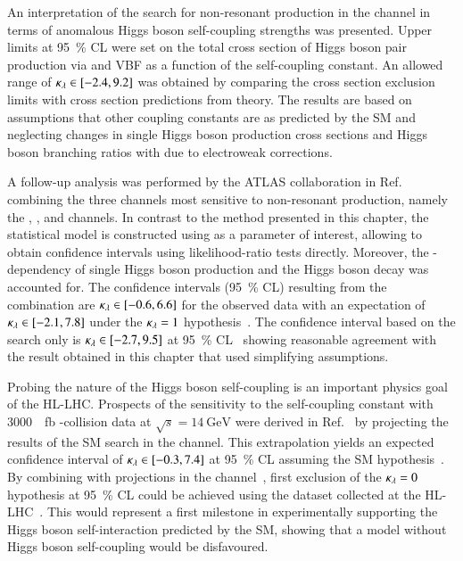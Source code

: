 An interpretation of the search for non-resonant \HH production in the
\bbtautau channel in terms of anomalous Higgs boson self-coupling
strengths was presented. Upper limits at \SI{95}{\percent} CL were set
on the total cross section of Higgs boson pair production via \ggF and
VBF as a function of the self-coupling constant. An allowed range of
$\kappa_{\lambda} \in [-2.4, 9.2]$ was obtained by comparing the cross section
exclusion limits with cross section predictions from theory. The
results are based on assumptions that other coupling constants are as
predicted by the SM and neglecting changes in single Higgs boson
production cross sections and Higgs boson branching ratios with
\klambda due to electroweak corrections.

A follow-up analysis was performed by the ATLAS collaboration in
Ref.~\cite{ATL-HDBS-2022-03-002} combining the three channels most
sensitive to non-resonant \HH production, namely the \bbtautau, \bbbb,
and \bbyy channels. In contrast to the method presented in this
chapter, the statistical model is constructed using \klambda as a
parameter of interest, allowing to obtain confidence intervals using
likelihood-ratio tests directly. Moreover, the \klambda-dependency of
single Higgs boson production and the Higgs boson decay was accounted
for. The confidence intervals (\SI{95}{\percent} CL) resulting from
the combination are $\kappa_{\lambda} \in [-0.6, 6.6]$ for the observed data
with an expectation of $\kappa_{\lambda} \in [-2.1, 7.8]$ under the
$\kappa_{\lambda} = 1$ hypothesis~\cite{ATL-HDBS-2022-03-002}. The \klambda
confidence interval based on the \bbtautau search only is
$\kappa_{\lambda} \in [-2.7, 9.5]$ at \SI{95}{\percent}
CL~\cite{ATL-HDBS-2022-03-002} showing reasonable agreement with the
result obtained in this chapter that used simplifying assumptions.

Probing the nature of the Higgs boson self-coupling is an important
physics goal of the HL-LHC. Prospects of the sensitivity to the
self-coupling constant with \SI{3000}{\per\femto\barn} \pp-collision
data at $\sqrt{s} = \SI{14}{\GeV}$ were derived in
Ref.~\cite{ATL-PHYS-PUB-2021-044} by projecting the results of the SM
\HH search in the \bbtautau channel. This extrapolation yields an
expected confidence interval of $\kappa_{\lambda} \in [-0.3, 7.4]$ at
\SI{95}{\percent} CL assuming the SM
hypothesis~\cite{ATL-PHYS-PUB-2021-044}. By combining with projections
in the \bbyy channel~\cite{ATL-PHYS-PUB-2022-001}, first exclusion of
the $\kappa_{\lambda} = 0$ hypothesis at \SI{95}{\percent} CL could be
achieved using the dataset collected at the
HL-LHC~\cite{ATL-PHYS-PUB-2022-005}. This would represent a first
milestone in experimentally supporting the Higgs boson
self-interaction predicted by the SM, showing that a model without
Higgs boson self-coupling would be disfavoured.

